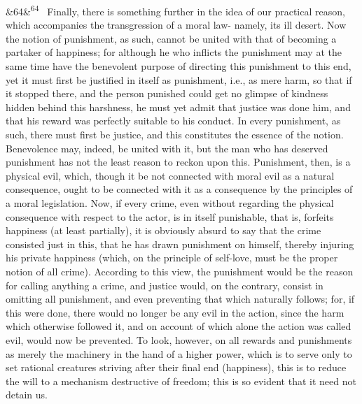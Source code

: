 \documentclass[12pt]{article}
\newcommand{\para}[1][]{\par\noindent\ifx&#1&\else\textsuperscript{\footnotesize #1}~\fi}
\begin{document}
\para[64] Finally, there is something further in the idea of our practical reason, which accompanies the transgression of a moral law- namely, its ill desert. Now the notion of punishment, as such, cannot be united with that of becoming a partaker of happiness; for although he who inflicts the punishment may at the same time have the benevolent purpose of directing this punishment to this end, yet it must first be justified in itself as punishment, i.e., as mere harm, so that if it stopped there, and the person punished could get no glimpse of kindness hidden behind this harshness, he must yet admit that justice was done him, and that his reward was perfectly suitable to his conduct. In every punishment, as such, there must first be justice, and this constitutes the essence of the notion. Benevolence may, indeed, be united with it, but the man who has deserved punishment has not the least reason to reckon upon this. Punishment, then, is a physical evil, which, though it be not connected with moral evil as a natural consequence, ought to be connected with it as a consequence by the principles of a moral legislation. Now, if every crime, even without regarding the physical consequence with respect to the actor, is in itself punishable, that is, forfeits happiness (at least partially), it is obviously absurd to say that the crime consisted just in this, that he has drawn punishment on himself, thereby injuring his private happiness (which, on the principle of self-love, must be the proper notion of all crime). According to this view, the punishment would be the reason for calling anything a crime, and justice would, on the contrary, consist in omitting all punishment, and even preventing that which naturally follows; for, if this were done, there would no longer be any evil in the action, since the harm which otherwise followed it, and on account of which alone the action was called evil, would now be prevented. To look, however, on all rewards and punishments as merely the machinery in the hand of a higher power, which is to serve only to set rational creatures striving after their final end (happiness), this is to reduce the will to a mechanism destructive of freedom; this is so evident that it need not detain us.
\end{document}
